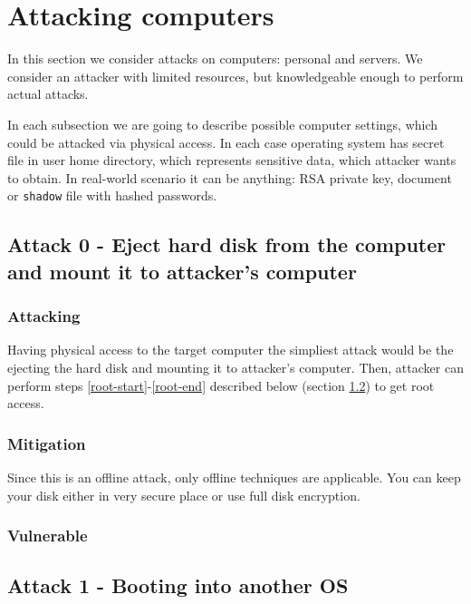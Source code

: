 \section{Attacking computers}
In this section we consider attacks on computers: personal and servers. We consider an attacker with limited resources, but knowledgeable enough to perform actual attacks. 

In each subsection we are going to describe possible computer settings, which could be attacked via physical access. In each case operating system has secret file in user home directory, which represents sensitive data, which attacker wants to obtain. In real-world scenario it can be anything: RSA private key, document or \texttt{shadow} file with hashed passwords.


\subsection{Attack 0 - Eject hard disk from the computer and mount it to attacker's computer} \label{a0}

\subsubsection*{Attacking}
Having physical access to the target computer the simpliest attack would be the ejecting the hard disk and mounting it to attacker's computer. Then, attacker can perform steps \ref{root-start}-\ref{root-end} described below (section \ref{a1}) to get root access.

\subsubsection*{Mitigation}
Since this is an offline attack, only offline techniques are applicable. You can keep your disk either in very secure place or use full disk encryption.

\subsubsection*{Vulnerable}


\subsection{Attack 1 - Booting into another OS}\label{a1}

